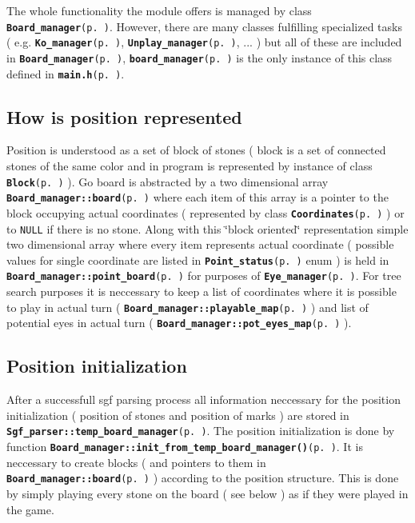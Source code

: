The whole functionality the module offers is managed by class {\tt {\bf Board\_\-manager}{\rm (p.\,\pageref{classBoard__manager})}}. However, there are many classes fulfilling specialized tasks ( e.g. {\tt {\bf Ko\_\-manager}{\rm (p.\,\pageref{classKo__manager})}}, {\tt {\bf Unplay\_\-manager}{\rm (p.\,\pageref{structUnplay__manager})}}, ... ) but all of these are included in {\tt {\bf Board\_\-manager}{\rm (p.\,\pageref{classBoard__manager})}}, {\tt {\bf board\_\-manager}{\rm (p.\,\pageref{main_8h_a1})}} is the only instance of this class defined in {\tt {\bf main.h}{\rm (p.\,\pageref{main_8h})}}.\subsection{How is position represented}\label{page_6_page_6__sec_1}
Position is understood as a set of block of stones ( block is a set of connected stones of the same color and in program is represented by instance of class {\tt {\bf Block}{\rm (p.\,\pageref{classBlock})}} ). Go board is abstracted by a two dimensional array {\tt {\bf Board\_\-manager::board}{\rm (p.\,\pageref{classBoard__manager_r1})}} where each item of this array is a pointer to the block occupying actual coordinates ( represented by class {\tt {\bf Coordinates}{\rm (p.\,\pageref{classCoordinates})}} ) or to {\tt NULL} if there is no stone. Along with this \char`\"{}block oriented\char`\"{} representation simple two dimensional array where every item represents actual coordinate ( possible values for single coordinate are listed in {\tt {\bf Point\_\-status}{\rm (p.\,\pageref{board_8h_a51})}} enum ) is held in {\tt {\bf Board\_\-manager::point\_\-board}{\rm (p.\,\pageref{classBoard__manager_o5})}} for purposes of {\tt {\bf Eye\_\-manager}{\rm (p.\,\pageref{classEye__manager})}}. For tree search purposes it is neccessary to keep a list of coordinates where it is possible to play in actual turn ( {\tt {\bf Board\_\-manager::playable\_\-map}{\rm (p.\,\pageref{classBoard__manager_r2})}} ) and list of potential eyes in actual turn ( {\tt {\bf Board\_\-manager::pot\_\-eyes\_\-map}{\rm (p.\,\pageref{classBoard__manager_o0})}} ).\subsection{Position initialization}\label{page_6_page_6__sec_2}
After a successfull sgf parsing process all information neccessary for the position initialization ( position of stones and position of marks ) are stored in {\tt {\bf Sgf\_\-parser::temp\_\-board\_\-manager}{\rm (p.\,\pageref{classSgf__parser_r12})}}. The position initialization is done by function {\tt {\bf Board\_\-manager::init\_\-from\_\-temp\_\-board\_\-manager()}{\rm (p.\,\pageref{classBoard__manager_a14})}}. It is neccessary to create blocks ( and pointers to them in {\tt {\bf Board\_\-manager::board}{\rm (p.\,\pageref{classBoard__manager_r1})}} ) according to the position structure. This is done by simply playing every stone on the board ( see below ) as if they were played in the game. 

